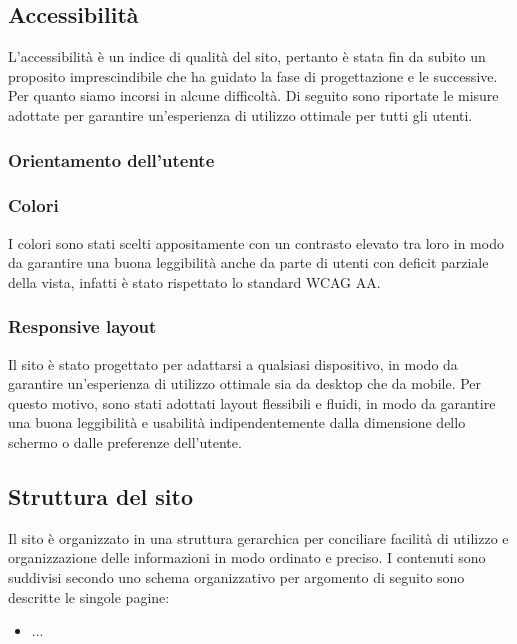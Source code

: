 \subsection{Accessibilità}

L'accessibilità è un indice di qualità del sito, pertanto è stata fin da subito
un proposito imprescindibile che ha guidato la fase di progettazione e le
successive. Per quanto siamo incorsi in alcune difficoltà. Di seguito sono
riportate le misure adottate per garantire un'esperienza di utilizzo ottimale
per tutti gli utenti.

\subsubsection{Orientamento dell'utente}

\subsubsection{Colori}

I colori sono stati scelti appositamente con un contrasto elevato tra loro in
modo da garantire una buona leggibilità anche da parte di utenti con deficit
parziale della vista, infatti è stato rispettato lo standard WCAG AA.

\subsubsection{Responsive layout}

Il sito è stato progettato per adattarsi a qualsiasi dispositivo, in modo da
garantire un'esperienza di utilizzo ottimale sia da desktop che da mobile. Per
questo motivo, sono stati adottati layout flessibili e fluidi, in modo da
garantire una buona leggibilità e usabilità indipendentemente dalla dimensione
dello schermo o dalle preferenze dell'utente.

\subsection{Struttura del sito}

Il sito è organizzato in una struttura gerarchica per conciliare facilità di
utilizzo e organizzazione delle informazioni in modo ordinato e preciso. I
contenuti sono suddivisi secondo uno schema organizzativo per argomento di
seguito sono descritte le singole pagine:

\begin{itemize}
	\item ...
\end{itemize}
